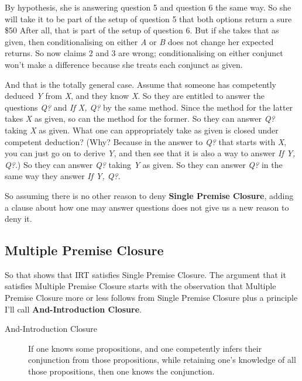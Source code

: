 \documentclass[
  12pt,
  letterpaper,
]{scrbook}
\begin{document}
By hypothesis, she is answering question 5 and question 6 the same way.
So she will take it to be part of the setup of question 5 that both
options return a sure \$50 After all, that is part of the setup of
question 6. But if she takes that as given, then conditionalising on
either \emph{A} or \emph{B} does not change her expected returns. So now
claims 2 and 3 are wrong; conditionalising on either conjunct won't make
a difference because she treats each conjunct as given.

And that is the totally general case. Assume that someone has
competently deduced \emph{Y} from \emph{X}, and they know \emph{X}. So
they are entitled to answer the questions \emph{Q?} and \emph{If X, Q?}
by the same method. Since the method for the latter takes \emph{X} as
given, so can the method for the former. So they can answer \emph{Q?}
taking \emph{X} as given. What one can appropriately take as given is
closed under competent deduction? (Why? Because in the answer to
\emph{Q?} that starts with \emph{X}, you can just go on to derive
\emph{Y}, and then see that it is also a way to answer \emph{If Y, Q?}.)
So they can answer \emph{Q?} taking \emph{Y} as given. So they can
answer \emph{Q?} in the same way they answer \emph{If Y, Q?}.

So assuming there is no other reason to deny \textbf{Single Premise
Closure}, adding a clause about how one may answer questions does not
give us a new reason to deny it.

\subsection{Multiple Premise Closure}\label{sec-andintro}

So that shows that IRT satisfies Single Premise Closure. The argument
that it satisfies Multiple Premise Closure starts with the observation
that Multiple Premise Closure more or less follows from Single Premise
Closure plus a principle I'll call \textbf{And-Introduction Closure}.

\begin{description}
\item[And-Introduction Closure]
If one knows some propositions, and one competently infers their
conjunction from those propositions, while retaining one's knowledge of
all those propositions, then one knows the conjunction.
\end{description}
\end{document}
